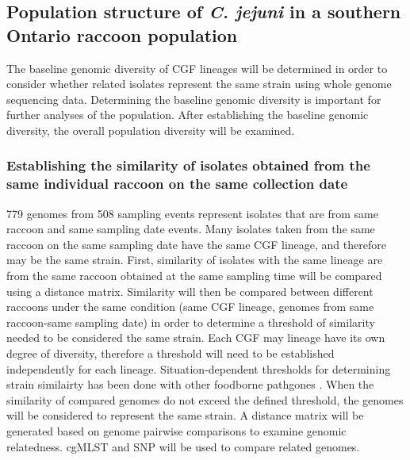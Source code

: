 \documentclass[letterpaper,titlepage,12pt]{article}
\begin{document}
\subsection{Population structure of \textit{C. jejuni} in a southern Ontario raccoon population}

The baseline genomic diversity of CGF lineages will be determined in order to consider whether related isolates represent the same strain using whole genome sequencing data. Determining the baseline genomic diversity is important for further analyses of the population. %
After establishing the baseline genomic diversity, the overall population diversity will be examined. %

\subsubsection{Establishing the similarity of isolates obtained from the same individual raccoon on the same collection date} %

779 genomes from 508 sampling events represent isolates that are from same raccoon and same sampling date events. Many isolates taken from the same raccoon on the same sampling date have the same CGF lineage, and therefore may be the same strain. First, similarity of isolates with the same lineage are from the same raccoon obtained at the same sampling time will be compared using a distance matrix. Similarity will then be compared between different raccoons under the same condition (same CGF lineage, genomes from same raccoon-same sampling date) in order to determine a threshold of similarity needed to be considered the same strain.  
Each CGF may lineage have its own degree of diversity, therefore a threshold will need to be established independently for each lineage. Situation-dependent thresholds for determining strain similairty has been done with other foodborne pathgones \parencite{lassen2016two}.  When the similarity of compared genomes do not exceed the defined threshold, the genomes will be considered to represent the same strain. A distance matrix will be generated based on genome pairwise comparisons to examine genomic relatedness. cgMLST and SNP will be used to compare related genomes. 
\end{document}
